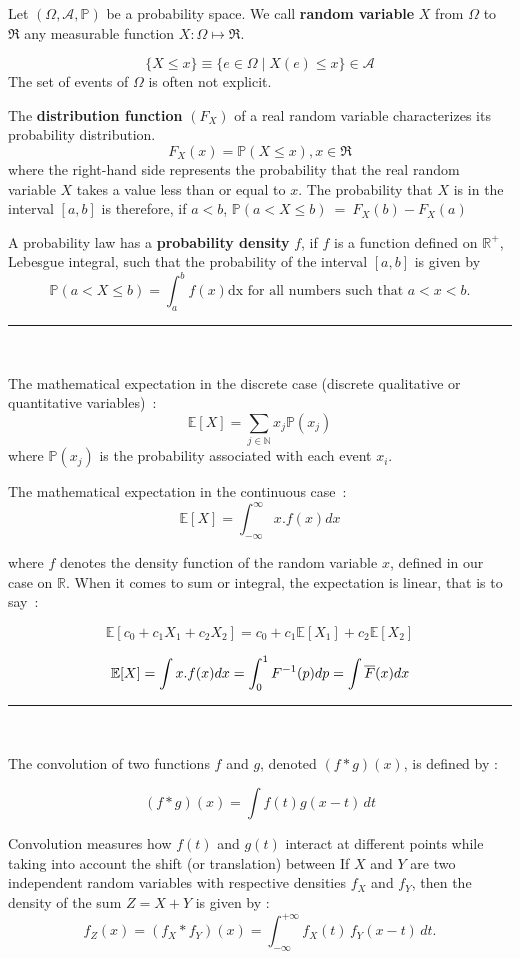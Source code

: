 \begin{f}
	
	Let \( (\Omega, \mathcal{A}, \mathbb{P})\) be a probability space. We call \textbf{random variable} \(X\) from \(\Omega\) to \( \Re\) any measurable function \(X:\Omega\mapsto \Re\).
	
	\[\lbrace X\leq x \rbrace\equiv \lbrace e\in \Omega \mid X(e)\leq x \rbrace \in   \mathcal{A}\]
	The set of events of \(\Omega\) is often not explicit.
	
	The \textbf{distribution function} \((F_X)\) of a real random variable characterizes its probability distribution.
	\[
	F_X(x)=\mathbb {P}(X\leq x), x\in \Re
	\]
	where the right-hand side represents the probability that the real random variable \(X\) takes a value less than or equal to \(x\).
	The probability that \(X\) is in the interval \([a, b]\) is therefore, if \(a< b\),
	\(
	\mathbb{P}(a< X\leq b)\ =\ F_X(b)-F_X(a)
	\)
	
	A probability law has a \textbf{probability density} \(f\), if \(f\) is a function defined on \(\mathbb{R}^{+}\), Lebesgue integral, such that the probability of the interval \([a, b]\) is given by
	\[
	\mathbb{P}(a< X\leq b)=\int_a^b f(x) \mathrm{dx} \mbox{ for all numbers such that }a<x<b.
	\]
\end{f}
\hrule
\begin{f}[Expectations]{\ }
	
	The mathematical expectation in the discrete case (discrete qualitative or quantitative variables)~:
	\[
	\mathbb{E}[X]=\sum_{j\in \mathbb{N}}x_j\mathbb{P}(x_j)
	\]
	where \(\mathbb{P}(x_j)\) is the probability associated with each event \(x_i\).
	
	The mathematical expectation in the continuous case~:
	\[
	\mathbb{E}[X]=\int_{-\infty}^{\infty} x. f(x)dx
	\]
	
	where \(f\) denotes the density function of the random variable \(x\), defined in our case on \(\mathbb{R}\).
	When it comes to sum or integral, the expectation is linear, that is to say~:
	
	\[\mathbb{E}[c_0+c_1X_1+c_2X_2]=c_0+c_1\mathbb{E}[X_1]+c_2\mathbb{E}[X_2]\]
	
	\[
	\mathbb{E}[X]=\int x.f(x)dx =\int_0^1 F^{-1}(p)dp= \int \overline{F}(x)dx\\
	\] 
\end{f}
\hrule
\begin{f}{\ }
	
	The convolution of two functions \( f \) and \( g \), denoted \( (f * g)(x) \), is defined by :
	
	\[
	(f * g)(x) = \int f(t) g(x - t) \, dt
	\]
	
	Convolution measures how \( f(t) \) and \( g(t) \) interact at different points while taking into account the shift (or translation) between
	If \(X\) and \(Y\) are two independent random variables with respective densities \(f_X\) and \(f_Y\), then the density of the sum \(Z = X + Y\) is given by :
	\[
	f_Z(x) = (f_X * f_Y)(x) = \int_{-\infty}^{+\infty} f_X(t)\, f_Y(x - t)\, dt.
	\]
	
\end{f}
